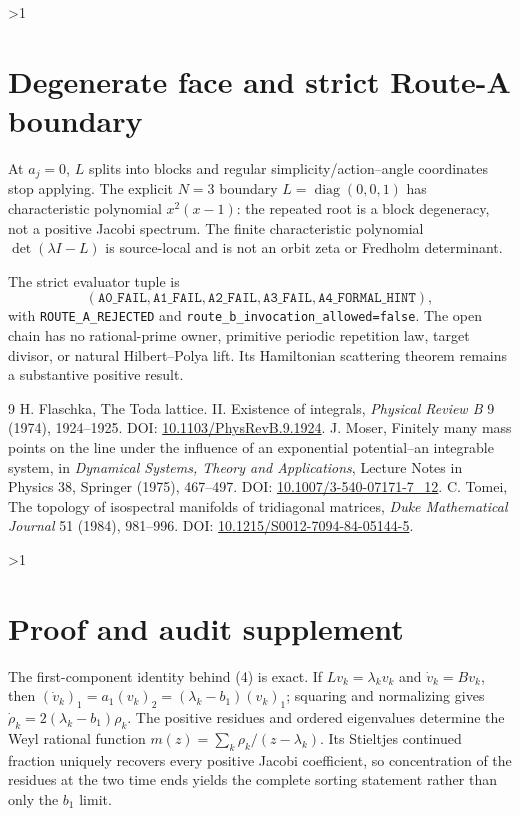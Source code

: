 \documentclass[10pt]{article}
\begin{document}
\ifnum\CRevisionRound>1
\section{Degenerate face and strict Route-A boundary}
At \(a_j=0\), \(L\) splits into blocks and regular simplicity/action--angle
coordinates stop applying. The explicit \(N=3\) boundary
\(L=\operatorname{diag}(0,0,1)\) has characteristic polynomial \(x^2(x-1)\):
the repeated root is a block degeneracy, not a positive Jacobi spectrum.
The finite characteristic polynomial \(\det(\lambda I-L)\) is source-local and
is not an orbit zeta or Fredholm determinant.

The strict evaluator tuple is
\[
(\mathtt{A0\_FAIL},\mathtt{A1\_FAIL},\mathtt{A2\_FAIL},
 \mathtt{A3\_FAIL},\mathtt{A4\_FORMAL\_HINT}),
\]
with \texttt{ROUTE\_A\_REJECTED} and
\texttt{route\_b\_invocation\_allowed=false}. The open chain has no
rational-prime owner, primitive periodic repetition law, target divisor, or
natural Hilbert--Polya lift. Its Hamiltonian scattering theorem remains a
substantive positive result.
\fi

\begin{thebibliography}{9}
 H. Flaschka, The Toda lattice. II. Existence of
integrals, \emph{Physical Review B} 9 (1974), 1924--1925.
DOI: \href{https://doi.org/10.1103/PhysRevB.9.1924}{10.1103/PhysRevB.9.1924}.
 J. Moser, Finitely many mass points on the line under the
influence of an exponential potential--an integrable system, in
\emph{Dynamical Systems, Theory and Applications}, Lecture Notes in Physics
38, Springer (1975), 467--497.
DOI: \href{https://doi.org/10.1007/3-540-07171-7_12}{10.1007/3-540-07171-7\_12}.
 C. Tomei, The topology of isospectral manifolds of
tridiagonal matrices, \emph{Duke Mathematical Journal} 51 (1984), 981--996.
DOI: \href{https://doi.org/10.1215/S0012-7094-84-05144-5}{10.1215/S0012-7094-84-05144-5}.
\end{thebibliography}

\ifnum\CRevisionRound>1
\section*{Proof and audit supplement}
The first-component identity behind (4) is exact.  If
$Lv_k=\lambda_kv_k$ and $\dot v_k=Bv_k$, then
$(\dot v_k)_1=a_1(v_k)_2=(\lambda_k-b_1)(v_k)_1$; squaring and normalizing
gives $\dot\rho_k=2(\lambda_k-b_1)\rho_k$.  The positive residues and ordered
eigenvalues determine the Weyl rational function
$m(z)=\sum_k\rho_k/(z-\lambda_k)$.  Its Stieltjes continued fraction uniquely
recovers every positive Jacobi coefficient, so concentration of the residues
at the two time ends yields the complete sorting statement rather than only
the $b_1$ limit.
\end{document}
